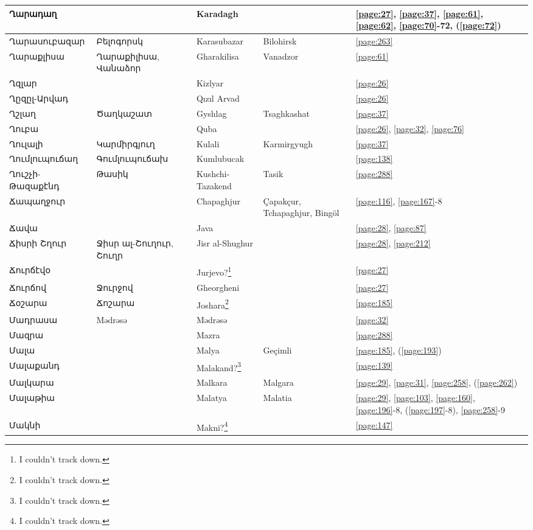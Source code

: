 \begin{center}
\begin{longtable}{|p{}|p{3cm}|p{3cm}|p{2cm}|p{3cm}|}
Ղարադաղ& &Karadagh & &\ref{page:27}, \ref{page:37}, \ref{page:61}, \ref{page:62}, \ref{page:70}-72, (\ref{page:72})\\ \hline
Ղարասուբազար& Բելոգորսկ&Karasubazar  &Bilohirsk &\ref{page:263}\\ \hline
Ղարաքլիսա&Ղարաքիլիսա, Վանաձոր &Gharakilisa & Vanadzor &\ref{page:61}\\ \hline
Ղզլար& &Kizlyar & &\ref{page:26}\\ \hline
Ղըզըլ-Արվադ& &Qızıl Arvad & &\ref{page:26}\\ \hline
Ղշլաղ&  Ծաղկաշատ&Gyshlag &Tsaghkashat &\ref{page:37}\\ \hline
Ղուբա& &Quba & &\ref{page:26}, \ref{page:32}, \ref{page:76}\\ \hline
Ղուլալի&Կարմիրգյուղ &Kulali & Karmirgyugh  &\ref{page:37}\\ \hline
Ղումլուպուճաղ& Գումլուպուճախ& Kumlubucak& &\ref{page:138}\\ \hline
Ղուշչի-Թազաքէնդ&Թասիկ & Kushchi-Tazakend  &Tasik &\ref{page:288}\\ \hline
Ճապաղջուր& &Chapaghjur & Çapakçur, Tchapaghjur, Bingöl&\ref{page:116}, \ref{page:167}-8\\ \hline
Ճավա& & Java& &\ref{page:28}, \ref{page:87}\\ \hline
Ճիսրի Շղուր& Ջիսր ալ-Շուղուր, Շուղր&Jisr al-Shughur & &\ref{page:28}, \ref{page:212}\\ \hline
Ճուրճէվօ& &Jurjevo?\footnote{I couldn't track down.} & &\ref{page:27}\\ \hline
Ճուրճով& Ջուրջով&Gheorgheni & &\ref{page:27}\\ \hline
Ճօշարա&Ճոշարա &Joshara\footnote{I couldn't track down. } & &\ref{page:185}\\ \hline
Մադրասա&Mədrəsə& Mədrəsə& &\ref{page:32}\\ \hline
Մազրա& &Mazra & &\ref{page:288}\\ \hline
Մալա& & Malya& Geçimli&\ref{page:185}, (\ref{page:193})\\ \hline
Մալաքանդ& & Malakand?\footnote{I couldn't track down.}& &\ref{page:139}\\ \hline
Մալկարա& &Malkara &Malgara &\ref{page:29}, \ref{page:31}, \ref{page:258}, (\ref{page:262})\\ \hline
Մալաթիա& & Malatya& Malatia&\ref{page:29}, \ref{page:103}, \ref{page:160}, \ref{page:196}-8, (\ref{page:197}-8), \ref{page:258}-9\\ \hline
Մակնի& & Makni?\footnote{I couldn't track down.}& &\ref{page:147}\\ \hline

\end{longtable}
\end{center}
